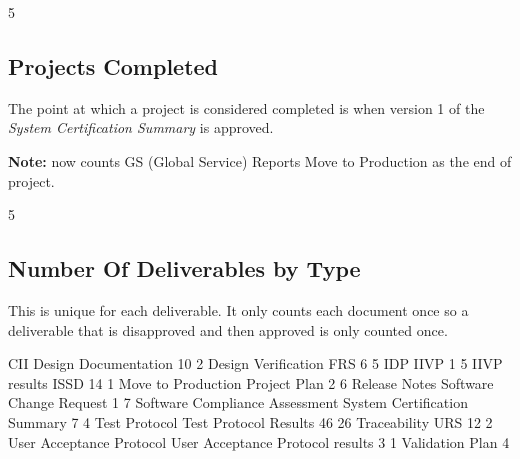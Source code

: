 \documentclass{article}
\begin{document}
\begin{Schunk}
\begin{Soutput}
[1] 5
\end{Soutput}
\end{Schunk}

\subsection{Projects Completed}

The point at which a project is considered completed is when version 1 of the
\textit{System Certification Summary} is approved.

\textbf{Note:} now counts GS (Global Service) Reports Move to Production as the end
of project.

\begin{Schunk}
\begin{Soutput}
[1] 5
\end{Soutput}
\end{Schunk}


\subsection{Number Of Deliverables by Type}
This is unique for each deliverable. It only counts each document once so a deliverable
that is disapproved and then approved is only counted once.

\begin{Schunk}
\begin{Soutput}
                             CII             Design Documentation 
                              10                                2 
             Design Verification                              FRS 
                               6                                5 
                             IDP                             IIVP 
                               1                                5 
                    IIVP results                             ISSD 
                              14                                1 
              Move to Production                     Project Plan 
                               2                                6 
                   Release Notes          Software Change Request 
                               1                                7 
  Software Compliance Assessment     System Certification Summary 
                               7                                4 
                   Test Protocol            Test Protocol Results 
                              46                               26 
                    Traceability                              URS 
                              12                                2 
        User Acceptance Protocol User Acceptance Protocol results 
                               3                                1 
                 Validation Plan 
                               4 
\end{Soutput}
\end{Schunk}
\end{document}
